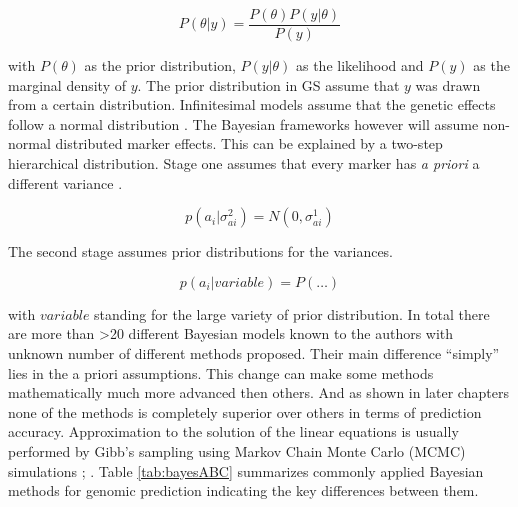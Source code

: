 \begin{equation}
P(\theta | y) = \frac{P(\theta )P(y | \theta)}{P(y)} 
\label{eqn:bayes}
\end{equation}

with $P(\theta )$ as the prior distribution, $P(y|\theta )$ as the likelihood and $P(y)$ as the marginal density of $y$. The prior distribution in GS assume that $y$ was drawn from a certain distribution. Infinitesimal models assume that the genetic effects follow a normal distribution \cite{legarra2018}. The Bayesian frameworks however will assume non-normal distributed marker effects. This can be explained by a two-step hierarchical distribution.
Stage one assumes that every marker has \textit{a priori} a different variance \cite{legarra2018}.

\begin{equation}
p(a_i|\sigma_{ai}^2) = N (0,\sigma^1_{ai})
 \label{eqn:stageonbayes}
\end{equation}

The second stage assumes prior distributions for the variances.

\begin{equation}
p(a_i| variable ) = P(\dots )
 \label{eqn:stagetwobayes}
\end{equation}

with $variable$ standing for the large variety of prior distribution. In total there are more than >20
different Bayesian models known to the authors with unknown number of different methods proposed. Their main
difference ``simply'' lies in the a priori assumptions. This change can make some methods mathematically much
more advanced then others. And as shown in later chapters none of the methods is completely superior over
others in terms of prediction accuracy. Approximation to the solution of the linear equations is usually performed by Gibb's sampling using Markov Chain Monte Carlo (MCMC) simulations \cite{dlc2009}; \cite{BGLR}.
Table \ref{tab:bayesABC} summarizes commonly applied Bayesian methods for genomic prediction indicating the key differences between them. 


